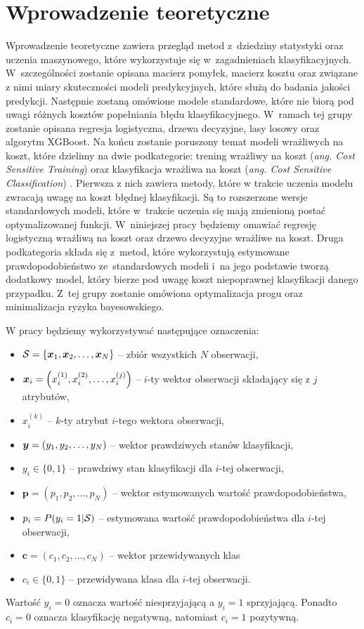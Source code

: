 \documentclass[inzynierska]{pwr_wmat_praca_dyplomowa}
\theoremstyle{plain}
\numberwithin{theorem}{chapter}
\theoremstyle{definition}
\numberwithin{theorem}{chapter}
\begin{document}
\chapter{Wprowadzenie teoretyczne}

Wprowadzenie teoretyczne zawiera przegląd metod z~dziedziny statystyki oraz uczenia maszynowego, które wykorzystuje się w~zagadnieniach klasyfikacyjnych. W~szczególności zostanie opisana macierz pomyłek, macierz kosztu oraz związane z nimi miary skuteczności modeli predykcyjnych, które służą do badania jakości predykcji. Następnie zostaną omówione modele standardowe, które nie biorą pod uwagi różnych kosztów popełniania błędu klasyfikacyjnego. W~ramach tej grupy zostanie opisana regresja logistyczna, drzewa decyzyjne, lasy losowy oraz algorytm XGBoost. Na końcu zostanie poruszony temat modeli wrażliwych na koszt, które dzielimy na dwie podkategorie: trening wrażliwy na koszt (\textit{ang. Cost Sensitive Training}) oraz klasyfikacja wrażliwa na koszt (\textit{ang. Cost Sensitive Classification}) \cite{RMoser}. Pierwsza z nich zawiera metody, które w trakcie uczenia modelu zwracają uwagę na koszt błędnej klasyfikacji. Są to rozszerzone wersje standardowych modeli, które w~trakcie uczenia się mają zmienioną postać optymalizowanej funkcji. W~niniejszej pracy będziemy omawiać regresję logistyczną wrażliwą na koszt oraz drzewo decyzyjne wrażliwe na koszt. Druga podkategoria składa się z~metod, które wykorzystują estymowane prawdopodobieństwo ze~standardowych modeli i~na jego podstawie tworzą dodatkowy model, który bierze pod uwagę koszt niepoprawnej klasyfikacji danego przypadku. Z~tej grupy zostanie omówiona optymalizacja progu oraz minimalizacja ryzyka bayesowskiego.

W pracy będziemy wykorzystywać następujące oznaczenia:
\begin{itemize}
	\item $\mathcal{S} = \{\boldsymbol{x}_1, \boldsymbol{x}_2, \dots, \boldsymbol{x}_N \}$ -- zbiór wszystkich $N$ obserwacji,
	\item $\boldsymbol{x}_{i} = \left(x_i^{(1)}, x_i^{(2)}, \dots, x_i^{(j)} \right)$ -- $i$-ty wektor obserwacji składający się z $j$ atrybutów,
	\item $x_i^{(k)}$ -- $k$-ty atrybut $i$-tego wektora obserwacji,
	\item $\boldsymbol{y} = (y_1, y_2, \dots, y_N)$ -- wektor prawdziwych stanów klasyfikacji,
	\item $y_i \in \{0,1\}$ -- prawdziwy stan klasyfikacji dla $i$-tej obserwacji,
	\item $\boldsymbol{p} = (p_1, p_2, \dots, p_N)$ -- wektor estymowanych wartość prawdopodobieństwa,
	\item $p_i = P(y_i = 1 | \mathcal{S})$ -- estymowana wartość prawdopodobieństwa dla $i$-tej obserwacji,
	\item $\boldsymbol{c} = (c_1, c_2, \dots, c_N) $ -- wektor przewidywanych klas
	\item $c_i \in \{0,1\} $ -- przewidywana klasa dla $i$-tej obserwacji.
\end{itemize}
Wartość $y_i = 0$ oznacza wartość niesprzyjającą a $y_i = 1$ sprzyjającą. Ponadto $c_i = 0$ oznacza klasyfikację negatywną, natomiast $c_i = 1$ pozytywną.
\end{document}
